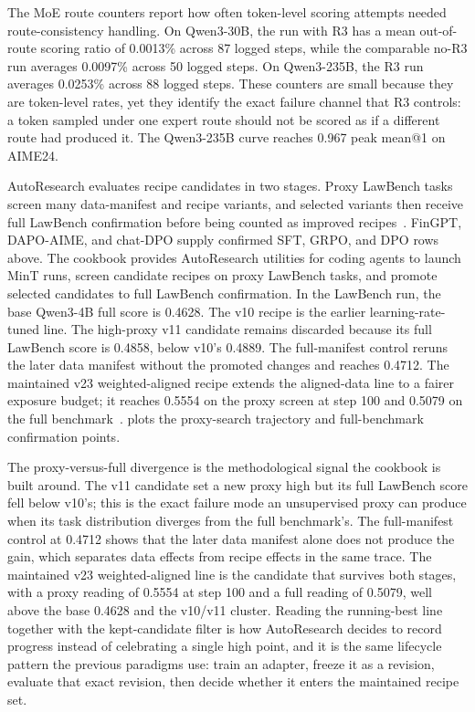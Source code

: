 \documentclass{llmxive}
\begin{document}
The MoE route counters report how often token-level scoring attempts needed route-consistency handling. On Qwen3-30B, the run with R3 has a mean out-of-route scoring ratio of 0.0013\% across 87 logged steps, while the comparable no-R3 run averages 0.0097\% across 50 logged steps. On Qwen3-235B, the R3 run averages 0.0253\% across 88 logged steps. These counters are small because they are token-level rates, yet they identify the exact failure channel that R3 controls: a token sampled under one expert route should not be scored as if a different route had produced it. The Qwen3-235B curve reaches 0.967 peak mean@1 on AIME24.

AutoResearch evaluates recipe candidates in two stages. Proxy LawBench tasks screen many data-manifest and recipe variants, and selected variants then receive full LawBench confirmation before being counted as improved recipes~\citep{lawbench2024}. FinGPT, DAPO-AIME, and chat-DPO supply confirmed SFT, GRPO, and DPO rows above. The cookbook provides AutoResearch utilities for coding agents to launch MinT runs, screen candidate recipes on proxy LawBench tasks, and promote selected candidates to full LawBench confirmation. In the LawBench run, the base Qwen3-4B full score is 0.4628. The v10 recipe is the earlier learning-rate-tuned line. The high-proxy v11 candidate remains discarded because its full LawBench score is 0.4858, below v10's 0.4889. The full-manifest control reruns the later data manifest without the promoted changes and reaches 0.4712. The maintained v23 weighted-aligned recipe extends the aligned-data line to a fairer exposure budget; it reaches 0.5554 on the proxy screen at step 100 and 0.5079 on the full benchmark~\citep{mint_cookbook2026}.  plots the proxy-search trajectory and full-benchmark confirmation points.

The proxy-versus-full divergence is the methodological signal the cookbook is built around. The v11 candidate set a new proxy high but its full LawBench score fell below v10's; this is the exact failure mode an unsupervised proxy can produce when its task distribution diverges from the full benchmark's. The full-manifest control at 0.4712 shows that the later data manifest alone does not produce the gain, which separates data effects from recipe effects in the same trace. The maintained v23 weighted-aligned line is the candidate that survives both stages, with a proxy reading of 0.5554 at step 100 and a full reading of 0.5079, well above the base 0.4628 and the v10/v11 cluster. Reading the running-best line together with the kept-candidate filter is how AutoResearch decides to record progress instead of celebrating a single high point, and it is the same lifecycle pattern the previous paradigms use: train an adapter, freeze it as a revision, evaluate that exact revision, then decide whether it enters the maintained recipe set.
\end{document}

